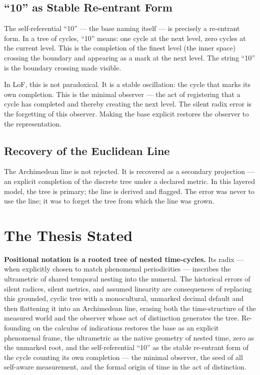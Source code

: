 \documentclass[12pt,a4paper]{article}
\theoremstyle{definition}
\theoremstyle{remark}
\begin{document}
\subsection{``10'' as Stable Re-entrant Form}

The self-referential ``10'' --- the base naming itself --- is precisely a
re-entrant form. In a tree of cycles, ``10'' means: one cycle at the next level,
zero cycles at the current level. This is the completion of the finest level (the
inner space) crossing the boundary and appearing as a mark at the next level. The
string ``10'' is the boundary crossing made visible.

In LoF, this is not paradoxical. It is a stable oscillation: the cycle that marks
its own completion. This is the minimal observer --- the act of registering that a
cycle has completed and thereby creating the next level. The silent radix error is
the forgetting of this observer. Making the base explicit restores the observer to
the representation.

\subsection{Recovery of the Euclidean Line}

The Archimedean line is not rejected. It is recovered as a secondary projection ---
an explicit completion of the discrete tree under a declared metric. In this
layered model, the tree is primary; the line is derived and flagged. The error was
never to use the line; it was to forget the tree from which the line was grown.

\section{The Thesis Stated}

\textbf{Positional notation is a rooted tree of nested time-cycles.} Its radix ---
when explicitly chosen to match phenomenal periodicities --- inscribes the
ultrametric of shared temporal nesting into the numeral. The historical errors of
silent radices, silent metrics, and assumed linearity are consequences of replacing
this grounded, cyclic tree with a monocultural, unmarked decimal default and then
flattening it into an Archimedean line, erasing both the time-structure of the
measured world and the observer whose act of distinction generates the tree.
Re-founding on the calculus of indications restores the base as an explicit
phenomenal frame, the ultrametric as the native geometry of nested time, zero as
the unmarked root, and the self-referential ``10'' as the stable re-entrant form of
the cycle counting its own completion --- the minimal observer, the seed of all
self-aware measurement, and the formal origin of time in the act of distinction.
\end{document}
